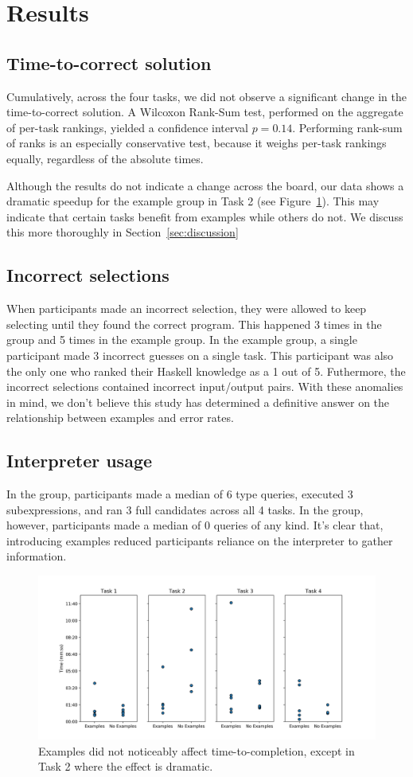 \section{Results}
\subsection{Time-to-correct solution}
Cumulatively, across the four tasks, we did not observe a significant change
in the time-to-correct solution.
%
A Wilcoxon Rank-Sum test, performed on the aggregate of per-task rankings,
yielded a confidence interval $p=0.14$.
%
Performing rank-sum of ranks is an especially conservative test, because it weighs
per-task rankings equally, regardless of the absolute times.

Although the results do not indicate a change across the board, our data shows a dramatic
speedup for the example group in Task 2 (see Figure~\ref{fig:data-points}).
%
This may indicate that certain tasks benefit from examples while others do not.
%
We discuss this more thoroughly in Section~\ref{sec:discussion}

\subsection{Incorrect selections}
When participants made an incorrect selection, they were allowed to keep
selecting until they found the correct program.
%
This happened 3 times in the \noexamples group and 5 times in the example group.
%
In the example group, a single participant made 3 incorrect guesses on a
single task.
%
This participant was also the only one who ranked their Haskell knowledge as a 1 out of 5.
%
Futhermore, the incorrect selections contained incorrect input/output pairs. 
%
With these anomalies in mind, we don't believe this study has determined a definitive answer
on the relationship between examples and error rates.

\subsection{Interpreter usage}
In the \noexamples group, participants made a median of 6 type queries,
executed 3 subexpressions, and ran 3 full candidates across all 4 tasks.
%
In the \examples group, however, participants made a median of 0 queries of any kind.
%
It's clear that, introducing examples reduced participants reliance on the
interpreter to gather information.

\begin{figure}[ht]
  \centering
  \includegraphics[width=\textwidth]{results/task_points.png}
  \caption{
    Examples did not noticeably affect time-to-completion, except in Task 2
    where the effect is dramatic.
  }
  \label{fig:data-points}
\end{figure}